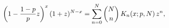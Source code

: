 \[\left(1-\frac{1-p}{p}z\right)^{x}(1+z)^{N-x}=\sum_{n=0}^{N}\binom{N}{n}\mathop%
{K_{n}\/}\nolimits\!\left(x;p,N\right)z^{n},\]